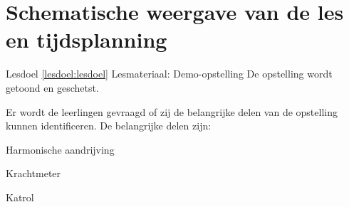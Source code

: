 
\section{Schematische weergave van de les en tijdsplanning}
\lesschematitel
\helplesdeel

\begin{frame}
    \begin{lesdeel}{
        Lesdoel \ref{lesdoel:lesdoel} 
        Lesmateriaal: Demo-opstelling
    }
        De opstelling wordt getoond en geschetst.
        
        Er wordt de leerlingen gevraagd of zij de belangrijke delen van de opstelling kunnen identificeren.
        De belangrijke delen zijn:
        \startolg
            \item{Harmonische aandrijving}
            \item{Krachtmeter}
            \item{Katrol}
        \stopolg
    \end{lesdeel}%
\end{frame}
